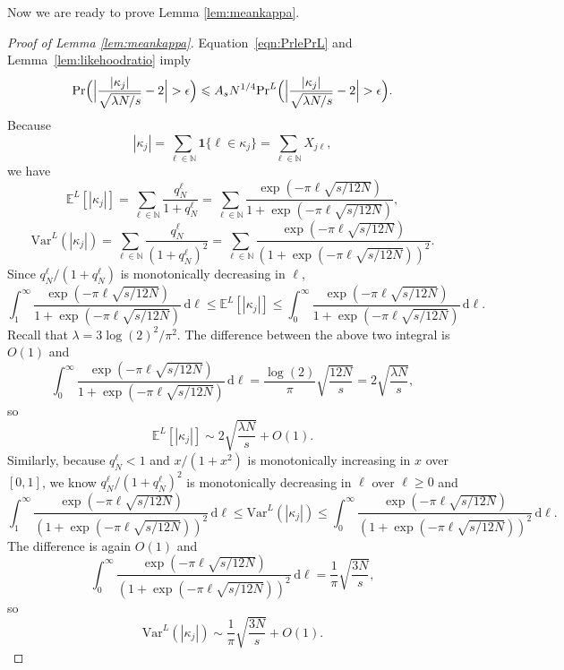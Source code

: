 \documentclass{article}
\theoremstyle{definition}
\renewcommand{\leq}{\leqslant}
\renewcommand{\geq}{\geqslant}
\newcommand{\natu}{\mathbb{N}}
\newcommand{\bsone}{\boldsymbol{1}}
\newcommand{\rd}{\,\mathrm{d}}
\newcommand{\e}{\mathbb{E}}
\newcommand{\var}{\mathrm{Var}}
\begin{document}
Now we are ready to prove Lemma \ref{lem:meankappa}.
\begin{proof}[Proof of Lemma \ref{lem:meankappa}]
    Equation~\eqref{eqn:PrlePrL} and Lemma~\ref{lem:likehoodratio} imply
    \begin{equation}\label{eqn:PrlePrLforkappa}
        \Pr\Bigl(\Big|\frac{|\kappa_j|}{\sqrt{\lambda N/s}}-2\Big|>\epsilon\Bigr)\leq A_sN^{1/4}{\textstyle\Pr}^L \Bigl(\Big|\frac{|\kappa_j|}{\sqrt{\lambda N/s}}-2\Big|>\epsilon\Bigr).
    \end{equation}
    Because 
        $$|\kappa_j|=\sum_{\ell\in \natu}\bsone\{\ell\in \kappa_j\}=\sum_{\ell\in \natu}X_{j\ell},$$
    we have
    $$\e^L[|\kappa_j|]=\sum_{\ell\in \natu}\frac{q_N^\ell}{1+q_N^\ell}=\sum_{\ell\in \natu}\frac{\exp(-\pi\ell\sqrt{s/12N})}{1+\exp(-\pi\ell\sqrt{s/12N})},$$
     $$\var^L(|\kappa_j|)=\sum_{\ell\in \natu}\frac{q_N^\ell}{(1+q_N^\ell)^2}=\sum_{\ell\in \natu}\frac{ \exp(-\pi\ell\sqrt{s/12N})}{(1+\exp(-\pi\ell\sqrt{s/12N}))^2}.$$       
     Since $q_N^\ell/(1+q_N^\ell)$ is monotonically decreasing in $\ell$,
     $$\int_1^\infty \frac{\exp(-\pi\ell\sqrt{s/12N})}{1+\exp(-\pi\ell\sqrt{s/12N})}\rd \ell\leq \e^L[|\kappa_j|]\leq \int_0^\infty \frac{\exp(-\pi\ell\sqrt{s/12N})}{1+\exp(-\pi\ell\sqrt{s/12N})}\rd \ell.$$
     Recall that $\lambda=3\log(2)^2/\pi^2$. The difference between the above two integral is $O(1)$ and 
     $$\int_0^\infty \frac{\exp(-\pi\ell\sqrt{s/12N})}{1+\exp(-\pi\ell\sqrt{s/12N})}\rd \ell=\frac{\log(2)}{\pi}\sqrt{\frac{12N}{s}}=2\sqrt{\frac{\lambda N}{s}},$$
     so 
     \begin{equation}\label{eqn:ELkappaasym}
         \e^L[|\kappa_j|]\sim 2\sqrt{\frac{\lambda N}{s}}+O(1).
     \end{equation}
         Similarly, because $q^\ell_N<1$ and $x/(1+x^2)$ is monotonically increasing in $x$ over $[0,1]$, we know $q_N^\ell/(1+q_N^\ell)^2$ is monotonically decreasing in $\ell$ over $\ell\geq 0$ and 
         \begin{equation*}
             \int_1^\infty \frac{ \exp(-\pi\ell\sqrt{s/12N})}{(1+\exp(-\pi\ell\sqrt{s/12N}))^2}\rd\ell\leq \var^L(|\kappa_j|)\leq \int_0^\infty \frac{ \exp(-\pi\ell\sqrt{s/12N})}{(1+\exp(-\pi\ell\sqrt{s/12N}))^2}\rd\ell.
         \end{equation*} 
    The difference is again $O(1)$ and 
    $$\int_0^\infty \frac{ \exp(-\pi\ell\sqrt{s/12N})}{(1+\exp(-\pi\ell\sqrt{s/12N}))^2}\rd\ell=\frac{1}{\pi}\sqrt{\frac{3 N}{s}},$$
    so
    \begin{equation}\label{eqn:varLasym}
        \var^L(|\kappa_j|)\sim \frac{1}{\pi}\sqrt{\frac{3 N}{s}}+O(1).

\end{equation}
\end{proof}
\end{document}
